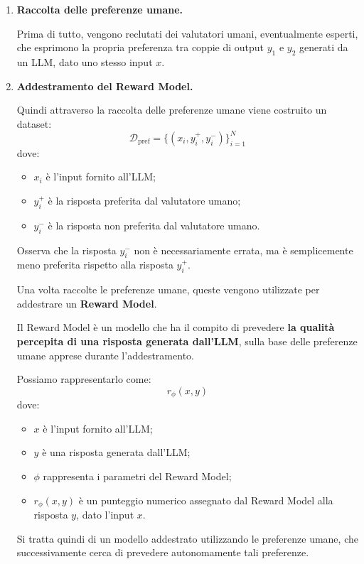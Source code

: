 \begin{enumerate}
    \item \textbf{Raccolta delle preferenze umane.}

    Prima di tutto, vengono reclutati dei valutatori umani,
    eventualmente esperti, che esprimono la propria preferenza
    tra coppie di output $y_1$ e $y_2$ generati da un LLM,
    dato uno stesso input $x$.

    \item \textbf{Addestramento del Reward Model.}

    Quindi attraverso la raccolta delle preferenze umane viene
    costruito un dataset:
    \[
        \mathcal D_{\mathrm{pref}}
        =
        \{(x_i,y_i^+,y_i^-)\}_{i=1}^{N}
    \]
    dove:
    \begin{itemize}
        \item $x_i$ è l'input fornito all'LLM;
        \item $y_i^+$ è la risposta preferita dal
        valutatore umano;
        \item $y_i^-$ è la risposta non preferita dal
        valutatore umano.
    \end{itemize}

    Osserva che la risposta $y_i^-$ non è necessariamente
    errata, ma è semplicemente meno preferita rispetto
    alla risposta $y_i^+$.

    Una volta raccolte le preferenze umane, queste vengono
    utilizzate per addestrare un \textbf{Reward Model}.

    Il Reward Model è un modello che ha il compito di
    prevedere \textbf{la qualità percepita di una risposta
    generata dall'LLM}, sulla base delle preferenze umane
    apprese durante l'addestramento.

    Possiamo rappresentarlo come:
    \[
        r_\phi(x,y)
    \]
    dove:
    \begin{itemize}
        \item $x$ è l'input fornito all'LLM;
        \item $y$ è una risposta generata dall'LLM;
        \item $\phi$ rappresenta i parametri del Reward Model;
        \item $r_\phi(x,y)$ è un punteggio numerico
        assegnato dal Reward Model alla risposta $y$,
        dato l'input $x$.
    \end{itemize}

    Si tratta quindi di un modello addestrato utilizzando
    le preferenze umane, che successivamente cerca di
    prevedere autonomamente tali preferenze.


\end{enumerate}
